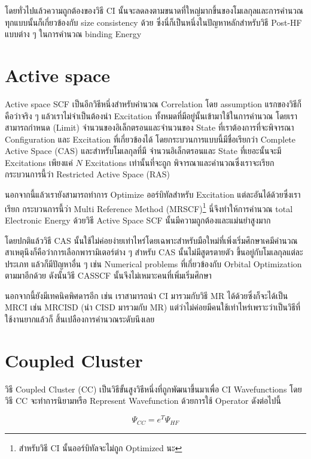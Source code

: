โดยทั่วไปแล้วความถูกต้องของวิธี CI นั้นจะลดลงตามขนาดที่ใหญ่มากขึ้นของโมเลกุลและการคำนวณทุกแบบนั้นก็เกี่ยวข้องกับ
size consistency ด้วย ซึ่งนี่ก็เป็นหนึ่งในปัญหาหลักสำหรับวิธี Post-HF แบบต่าง ๆ ในการคำนวณ binding Energy

\section{Active space}

Active space SCF เป็นอีกวิธีหนึ่งสำหรับคำนวณ Correlation โดย assumption แรกของวิธีก็คือว่าจริง ๆ
แล้วเราไม่จำเป็นต้องนำ Excitation ทั้งหมดที่มีอยู่นั้นเข้ามาใช้ในการคำนวณ โดยเราสามารถกำหนด (Limit)
จำนวนของอิเล็กตรอนและจำนวนของ State ที่เราต้องการที่จะพิจารณา Configuration และ Excitation
ที่เกี่ยวข้องได้ โดยกระบวนการแบบนี้มีชื่อเรียกว่า Complete Active Space (CAS) และสำหรับโมเลกุลที่มี%
จำนวนอิเล็กตรอนและ State ที่เยอะนั้นจะมี Excitations เพียงแค่ $N$ Excitations เท่านั้นที่จะถูก%
พิจารณาและคำนวณซึ่งเราจะเรียกกระบวนการนี้ว่า Restricted Active Space (RAS)

นอกจากนี้แล้วเรายังสามารถทำการ Optimize ออร์บิทัลสำหรับ Excitation แต่ละอันได้ด้วยซึ่งเราเรียก%
กระบวนการนี้ว่า Multi Reference Method (MRSCF)\footnote{สำหรับวิธี CI นั้นออร์บิทัลจะไม่ถูก 
Optimized นะ} นี่จึงทำให้การคำนวณ total Electronic Energy ด้วยวิธี Active Space SCF
นั้นมีความถูกต้องและแม่นยำสูงมาก

โดยปกติแล้ววิธี CAS นั้นใช้ไม่ค่อยง่ายเท่าไหร่โดยเฉพาะสำหรับมือใหม่ที่เพิ่งเริ่มศึกษาเคมีคำนวณ
สาเหตุนึงก็คือว่าการเลือกพารามิเตอร์ต่าง ๆ สำหรับ CAS นั้นไม่มีสูตรตายตัว ขึ้นอยู่กับโมเลกุลแต่ละประเภท
แล้วก็มีปัญหาอื่น ๆ เช่น Numerical problems ที่เกี่ยวข้องกับ Orbital Optimization ตามมาอีกด้วย
ดังนั้นวิธี CASSCF นั้นจึงไม่เหมาะคนที่เพิ่มเริ่มศึกษา

นอกจากนี้ยังมีเทคนิคพิศดารอีก เช่น เราสามารถนำ CI มารวมกับวิธี MR ได้ด้วยซึ่งก็จะได้เป็น MRCI
เช่น MRCISD (นำ CISD มารวมกับ MR) แต่ว่าไม่ค่อยมีคนใช้เท่าไหร่เพราะว่าเป็นวิธีที่ใช้งานยากแล้วก็%
สิ้นเปลืองการคำนวณระดับนึงเลย

\section{Coupled Cluster}

วิธี Coupled Cluster (CC) เป็นวิธีขั้นสูงวิธีหนึ่งที่ถูกพัฒนาขึ้นมาเพื่อ CI Wavefunctions
โดยวิธี CC จะทำการนิยามหรือ Represent Wavefunction ด้วยการใช้ Operator ดังต่อไปนี้

\begin{equation}
    \Psi_{CC} = e^{T} \Psi_{HF}
\end{equation}


